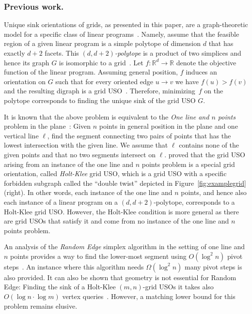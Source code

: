 \documentclass[runningheads,a4paper]{llncs}
\newcommand{\RR}{\ensuremath{\mathbb{R}}}
\begin{document}
\subsubsection{Previous work.}

Unique sink orientations of grids, as presented in this paper,
are a graph-theoretic model for a specific class of linear programs~\cite{linepoint}.
Namely, assume that the feasible region of a given linear program is a
simple polytope of dimension $d$ that has exactly $d+2$ facets.
This \emph{$(d, d+2)$-polytope} is a product of two simplices and hence its graph $G$ is isomorphic to a grid~\cite{grid05}. 
Let $f : \RR^d \to \RR$ denote the objective function of the linear program.
Assuming general position, $f$ induces an orientation on $G$ such that for every oriented
edge $u \to v$ we have $f(u) > f(v)$ and the resulting digraph is a grid USO~\cite{grid05}.
Therefore, minimizing~$f$ on the polytope corresponds to finding the
unique sink of the grid USO $G$.

It is known that the above problem is equivalent to the \emph{One line and $n$ points} problem in the plane~\cite{linepoint,welzl2001entering}:
Given $n$ points in general position in the plane and one vertical line $\ell$, find the segment connecting two pairs of points that has the lowest intersection with the given line. 
We assume that $\ell$ contains none of the given points and that no two segments intersect on $\ell$.
\citet{linepoint} proved that the grid USO arising from an instance of the one line and $n$ points problem is a special grid orientation, called \emph{Holt-Klee} grid USO, which is a grid USO with a specific forbidden subgraph called the ``double twist'' depicted in Figure~\ref{fig:examplegrid} (right). In other words, each instance of the one line and $n$ points, and hence also each instance of a linear program on a $(d, d+2)$-polytope, corresponds to a Holt-Klee grid USO. 
However, the Holt-Klee condition is more general as there are grid USOs that satisfy it and  come from no instance of the one line and $n$ points problem. 

An analysis of the \emph{Random Edge} simplex algorithm in the setting of one line and $n$ points provides a way to find the lower-most segment using $O(\log^2 n )$ pivot steps~\cite{linepoint}. 
An instance where this algorithm needs $\Omega(\log^2 n )$ many pivot steps is also provided. 
It can also be shown that geometry is not essential for Random Edge: Finding the sink of a Holt-Klee $(m,n)$-grid USOs it takes also $O(\log n\cdot\log m)$ vertex queries~\cite{grid05,falkthesis}. However, a matching lower bound for this problem remains elusive.
\end{document}
